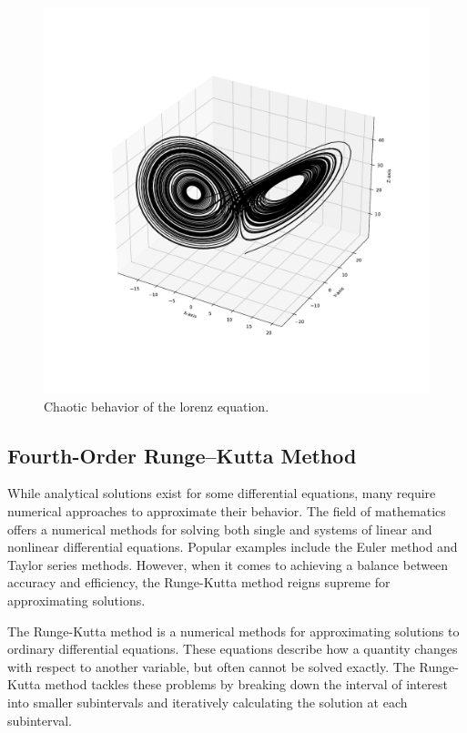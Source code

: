 \documentclass[11pt]{article}
\theoremstyle{definition}
\begin{document}
\begin{figure}
\centering
\includegraphics[trim=2cm 2cm 2cm 2cm, clip, scale=0.3]{Lorenz.pdf}
\caption{Chaotic behavior of the lorenz equation.}
\label{fig:LE}
\end{figure}

\subsection{Fourth-Order Runge–Kutta Method}
While analytical solutions exist for some differential equations, many require numerical approaches to approximate their behavior. The field of mathematics offers a numerical methods for solving both single and systems of linear and nonlinear differential equations. Popular examples include the Euler method and Taylor series methods. However, when it comes to achieving a balance between accuracy and efficiency, the Runge-Kutta method reigns supreme for approximating solutions.

The Runge-Kutta method \cite{bose_numerical_2019} is a numerical methods for approximating solutions to ordinary differential equations. These equations describe how a quantity changes with respect to another variable, but often cannot be solved exactly. The Runge-Kutta method tackles these problems by breaking down the interval of interest into smaller subintervals and iteratively calculating the solution at each subinterval. 
\end{document}

